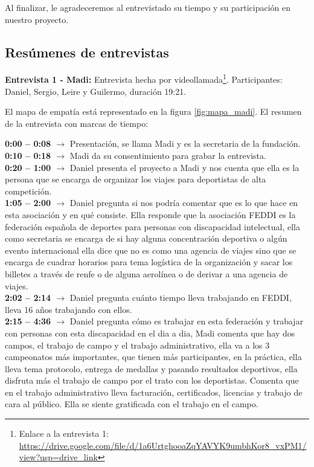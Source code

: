 Al finalizar, le agradeceremos al entrevistado su tiempo y su participación en nuestro proyecto.


\subsection{Resúmenes de entrevistas}

\textbf{Entrevista 1 - Madi:} Entrevista hecha por videollamada\footnote{Enlace a la entrevista 1: \url{https://drive.google.com/file/d/1a6UrtghooaZqYAVYK9umbhKor8_vxPM1/view?usp=drive_link}}. Participantes: Daniel, Sergio, Leire y Guilermo, duración 19:21.

El mapa de empatía está representado en la figura \ref{fig:mapa_madi}. El resumen de la entrevista con marcas de tiempo:

\noindent\textbf{0:00 -- 0:08 $\rightarrow$} Presentación, se llama Madi y es la secretaria de la fundación. \\
\textbf{0:10 -- 0:18 $\rightarrow$} Madi da su consentimiento para grabar la entrevista. \\
\textbf{0:20 -- 1:00 $\rightarrow$} Daniel presenta el proyecto a Madi y nos cuenta que ella es la persona que se encarga de organizar los viajes para deportistas de alta competición. \\
\textbf{1:05 -- 2:00 $\rightarrow$} Daniel pregunta si nos podría comentar que es lo que hace en esta asociación y en qué consiste. Ella responde que la asociación FEDDI es la federación española de deportes para personas con discapacidad intelectual, ella como secretaria se encarga de si hay alguna concentración deportiva o algún evento internacional ella dice que no es como una agencia de viajes sino que se encarga de cuadrar horarios para tema logística de la organización y sacar los billetes a través de renfe o de alguna aerolínea o de derivar a una agencia de viajes. \\
\textbf{2:02 -- 2:14 $\rightarrow$} Daniel pregunta cuánto tiempo lleva trabajando en FEDDI, lleva 16 años trabajando con ellos. \\
\textbf{2:15 -- 4:36 $\rightarrow$} Daniel pregunta cómo es trabajar en esta federación y trabajar con personas con esta discapacidad en el dia a dia, Madi comenta que hay dos campos, el trabajo de campo y el trabajo administrativo, ella va a los 3 campeonatos más importantes, que tienen más participantes, en la práctica, ella lleva tema protocolo, entrega de medallas y pasando resultados deportivos, ella disfruta más el trabajo de campo por el trato con los deportistas. Comenta que en el trabajo administrativo lleva facturación, certificados, licencias y trabajo de cara al público. Ella se siente gratificada con el trabajo en el campo. \\
